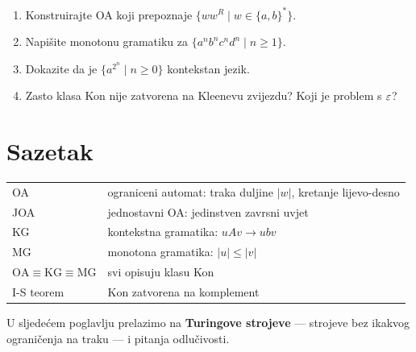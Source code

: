 \begin{zadatak}
\begin{enumerate}[label=(\alph*), itemsep=4pt]
  \item Konstruirajte OA koji prepoznaje $\{ww^R \mid w \in \{a,b\}^*\}$.
  \item Napišite monotonu gramatiku za $\{a^n b^n c^n d^n \mid n \geq 1\}$.
  \item Dokazite da je $\{a^{2^n} \mid n \geq 0\}$ kontekstan jezik.
  \item Zasto klasa Kon nije zatvorena na Kleenevu zvijezdu?
        Koji je problem s $\varepsilon$?
\end{enumerate}
\end{zadatak}

\section*{Sazetak}

\medskip\noindent
\begin{tabular}{ll}
  OA & ograniceni automat: traka duljine $|w|$, kretanje lijevo-desno \\
  JOA & jednostavni OA: jedinstven zavrsni uvjet \\
  KG & kontekstna gramatika: $uAv \to ubv$ \\
  MG & monotona gramatika: $|u| \leq |v|$ \\
  $\mathrm{OA} \equiv \mathrm{KG} \equiv \mathrm{MG}$ & svi opisuju klasu Kon \\
  I-S teorem & $\mathrm{Kon}$ zatvorena na komplement \\
\end{tabular}

\medskip\noindent
U sljedećem poglavlju prelazimo na \textbf{Turingove strojeve} ---
strojeve bez ikakvog ograničenja na traku --- i pitanja odlučivosti.